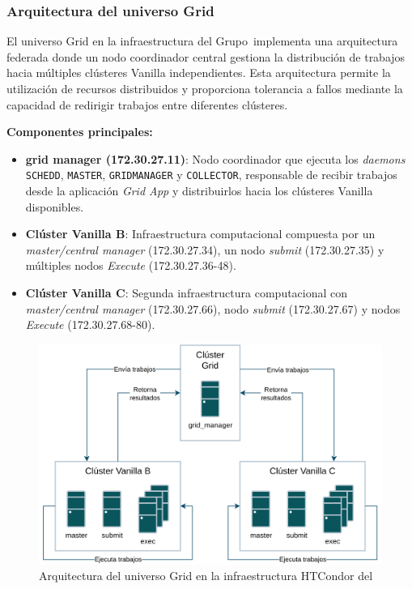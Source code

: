 \FloatBarrier\subsubsection{Arquitectura del universo Grid}

El universo Grid en la infraestructura del Grupo~\GRID implementa una arquitectura federada donde un nodo coordinador central gestiona la distribución de trabajos hacia múltiples clústeres Vanilla independientes. Esta arquitectura permite la utilización de recursos distribuidos y proporciona tolerancia a fallos mediante la capacidad de redirigir trabajos entre diferentes clústeres.

\textbf{Componentes principales:}

\begin{itemize}
	\item \textbf{grid manager (172.30.27.11)}: Nodo coordinador que ejecuta los \textit{daemons} \texttt{SCHEDD}, \texttt{MASTER}, \texttt{GRIDMANAGER} y \texttt{COLLECTOR}, responsable de recibir trabajos desde la aplicación \textit{Grid App} y distribuirlos hacia los clústeres Vanilla disponibles.
	
	\item \textbf{Clúster Vanilla B}: Infraestructura computacional compuesta por un \textit{master/central manager} (172.30.27.34), un nodo \textit{submit} (172.30.27.35) y múltiples nodos \textit{Execute} (172.30.27.36-48).

	\item \textbf{Clúster Vanilla C}: Segunda infraestructura computacional con \textit{master/central manager} (172.30.27.66), nodo \textit{submit} (172.30.27.67) y nodos \textit{Execute} (172.30.27.68-80).
\end{itemize}

\begin{figure}
	\centering
	\includegraphics[scale=0.11]{apendices/infra-virtual/Diagramas HTCondor-Grid-flow.drawio.png}
	\caption{Arquitectura del universo Grid en la infraestructura HTCondor del~\GRID}
	\label{fig:grid-architecture}
\end{figure}


